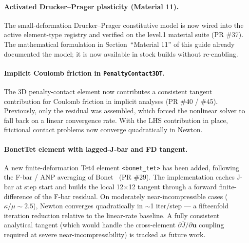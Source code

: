 \paragraph{Activated Drucker--Prager plasticity (Material 11).}
The small-deformation Drucker--Prager constitutive model is now wired
into the active element-type registry and verified on the
level.1 material suite (PR \#37).  The mathematical formulation in
Section~``Material 11'' of this guide already documented the model;
it is now available in stock builds without re-enabling.

\paragraph{Implicit Coulomb friction in \texttt{PenaltyContact3DT}.}
The 3D penalty-contact element now contributes a consistent tangent
contribution for Coulomb friction in implicit analyses (PR \#40 /
\#45).  Previously, only the residual was assembled, which forced the
nonlinear solver to fall back on a linear convergence rate.  With the
LHS contribution in place, frictional contact problems now converge
quadratically in Newton.

\paragraph{BonetTet element with lagged-J-bar and FD tangent.}
A new finite-deformation Tet4 element \texttt{<bonet\_tet>} has been
added, following the F-bar / ANP averaging of Bonet \etal\ (PR \#29).
The implementation caches J-bar at step start and builds the local
12$\times$12 tangent through a forward finite-difference of the F-bar
residual.  On moderately near-incompressible cases ($\kappa/\mu \sim
2.5$), Newton converges quadratically in $\sim$1 iter/step --- a
fifteenfold iteration reduction relative to the linear-rate baseline.
A fully consistent analytical tangent (which would handle the
cross-element $\partial \bar{J} / \partial \mathbf{u}$ coupling
required at severe near-incompressibility) is tracked as future work.

